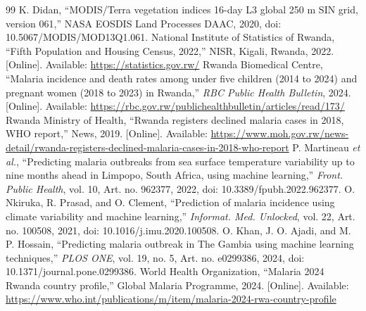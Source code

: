 \documentclass[11pt]{article}
\begin{document}
\begin{thebibliography}{99}
 K. Didan, ``MODIS/Terra vegetation indices 16-day L3 global 250 m SIN grid, version 061,'' NASA EOSDIS Land Processes DAAC, 2020, doi: 10.5067/MODIS/MOD13Q1.061.
 National Institute of Statistics of Rwanda, ``Fifth Population and Housing Census, 2022,'' NISR, Kigali, Rwanda, 2022. [Online]. Available: \url{https://statistics.gov.rw/}
 Rwanda Biomedical Centre, ``Malaria incidence and death rates among under five children (2014 to 2024) and pregnant women (2018 to 2023) in Rwanda,'' \textit{RBC Public Health Bulletin}, 2024. [Online]. Available: \url{https://rbc.gov.rw/publichealthbulletin/articles/read/173/}
 Rwanda Ministry of Health, ``Rwanda registers declined malaria cases in 2018, WHO report,'' News, 2019. [Online]. Available: \url{https://www.moh.gov.rw/news-detail/rwanda-registers-declined-malaria-cases-in-2018-who-report}
 P. Martineau \textit{et al.}, ``Predicting malaria outbreaks from sea surface temperature variability up to nine months ahead in Limpopo, South Africa, using machine learning,'' \textit{Front. Public Health}, vol. 10, Art. no. 962377, 2022, doi: 10.3389/fpubh.2022.962377.
 O. Nkiruka, R. Prasad, and O. Clement, ``Prediction of malaria incidence using climate variability and machine learning,'' \textit{Informat. Med. Unlocked}, vol. 22, Art. no. 100508, 2021, doi: 10.1016/j.imu.2020.100508.
 O. Khan, J. O. Ajadi, and M. P. Hossain, ``Predicting malaria outbreak in The Gambia using machine learning techniques,'' \textit{PLOS ONE}, vol. 19, no. 5, Art. no. e0299386, 2024, doi: 10.1371/journal.pone.0299386.
 World Health Organization, ``Malaria 2024 Rwanda country profile,'' Global Malaria Programme, 2024. [Online]. Available: \url{https://www.who.int/publications/m/item/malaria-2024-rwa-country-profile}
\end{thebibliography}
\end{document}
